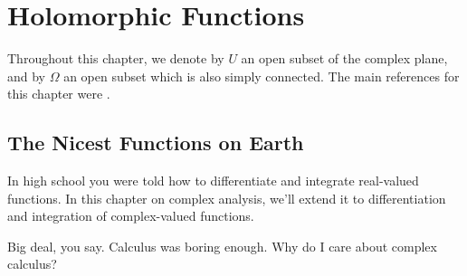 \chapter{Holomorphic Functions}
Throughout this chapter, we denote by $U$ an open subset of the complex plane,
and by $\Omega$ an open subset which is also simply connected.
The main references for this chapter were \cite{ref:dartmouth,ref:bak_ca}.

\section{The Nicest Functions on Earth}
In high school you were told how to differentiate and integrate real-valued functions.
In this chapter on complex analysis, we'll extend it to differentiation and integration of complex-valued functions.

Big deal, you say. Calculus was boring enough. Why do I care about complex calculus?

